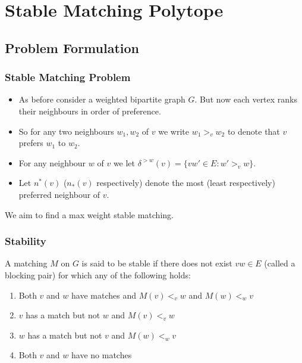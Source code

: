 \documentclass{beamer}
\begin{document}
\section{Stable Matching Polytope}
\subsection{Problem Formulation}
\begin{frame}
\frametitle{Stable Matching Problem}
\begin{itemize} \item As before consider a weighted bipartite graph $G$. But now each vertex ranks their neighbours in order of preference. \item So for any two neighbours $w_1, w_2$ of $v$ we write $w_1 >_v w_2$ to denote that $v$ prefers $w_1$ to $w_2$. \item For any neighbour $w$ of $v$ we let $\delta^{>w}(v) = \{vw' \in E : w' >_v w\}$. \item Let $n^*(v)$ ($n_*(v)$ respectively) denote the most (least respectively) preferred neighbour of $v$. \end{itemize} We aim to find a max weight stable matching.
\end{frame}

\begin{frame}
\frametitle{Stability}
A matching $M$ on $G$ is said to be stable if there does not exist $vw \in E$ (called a blocking pair) for which any of the following holds:
\begin{enumerate}
\item Both $v$ and $w$ have matches and $M(v) <_v w$ and $M(w) <_w v$ \\
\item $v$ has a match but not $w$ and $M(v) <_v w$\\
\item $w$ has a match but not $v$ and $M(w) <_w v$\\
\item Both $v$ and $w$ have no matches
\end{enumerate}
\end{frame}
\end{document}
